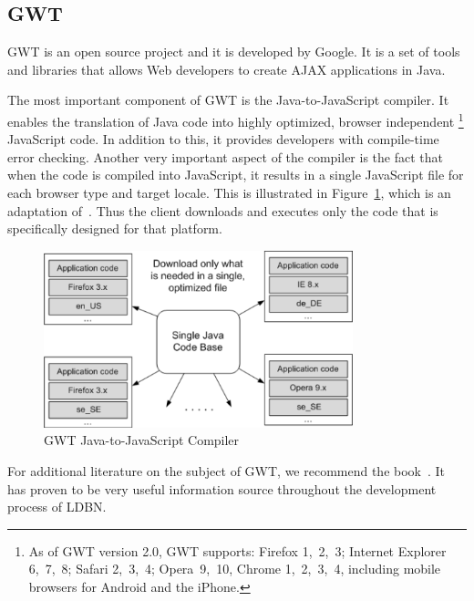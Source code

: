 \subsection{GWT}
\label{sec:gwt}

GWT is an open source project
and it is developed by Google. It is a set of tools and libraries that allows Web developers to
create AJAX applications in Java. 

The most important component of GWT is the Java-to-JavaScript compiler. It enables the
translation of Java code into highly optimized, browser independent
\footnote{As of GWT version 2.0, GWT supports: 
Firefox 1,~2,~3; Internet Explorer 6,~7,~8; Safari 2,~3,~4; Opera~9,~10, Chrome 1,~2,~3,~4, including mobile browsers for Android and the iPhone.} 
JavaScript code.
In addition to this, it provides developers with compile-time error checking. Another
very important aspect of the compiler is the fact that when the code is compiled into
JavaScript, it results in a single JavaScript file for each browser type and target locale.
This is illustrated in Figure~\ref{fig:gwt01}, which is an adaptation of~\cite[Figure 7]{wgio2}. 
Thus the client downloads and executes only the code that is specifically designed for that platform.  

\begin{figure}[ht]
	\begin{center}
		\includegraphics[width=0.8\textwidth]{./img/gwt01a.png}
		\caption{GWT Java-to-JavaScript Compiler}
		\label{fig:gwt01}
	\end{center}
\end{figure}

For additional literature on the subject of GWT, we recommend the book~\cite{bgwt2}. 
It has
proven to be very useful information source throughout the development process 
of LDBN. 

